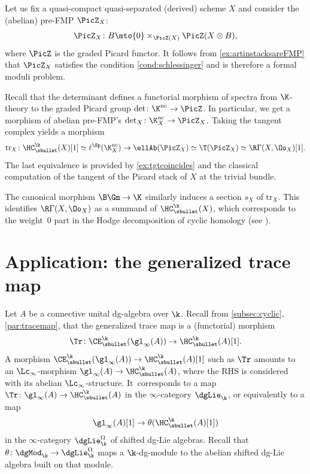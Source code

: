 \begin{ex}

Let us fix a quasi-compact quasi-separated (derived) scheme $X$ and consider the (abelian) pre-FMP $\PicZ_X$:
\[
\PicZ_X \colon B \mto \{0\} \times_{\PicZ(X)} \PicZ(X \otimes B),
\]
where $\PicZ$ is the graded Picard functor.
It follows from \autoref{ex:artinstacksareFMP} that $\PicZ_X$ satisfies the condition \eqref{cond:schlessinger} and is therefore a formal moduli problem.

Recall that the determinant defines a functorial morphism of spectra from $\K$-theory to the graded Picard group $\det \colon \K^\mathrm{nc} \to \PicZ$.
In particular, we get a morphism of abelian pre-FMP's $\det_X \colon \K^\mathrm{nc}_X \to \PicZ_X$.
Taking the tangent complex yields a morphism
\[
\mathrm{tr}_X \colon \HC_\sbullet^\k(X)[1] \simeq \ell^\Sp(\K^\mathrm{nc}_X) \to \ellAb(\PicZ_X) \simeq \T(\PicZ_X) \simeq \R\Gamma(X, \Oo_X)[1].
\]
The last equivalence is provided by \autoref{ex:tgtcoincides} and the classical computation of the tangent of the Picard stack of $X$ at the trivial bundle.

The canonical morphism $\B\Gm \to \K$ similarly induces a section $s_X$ of $\mathrm{tr}_X$. This identifies $\R\Gamma(X, \Oo_X)$ as a summand of $\HC_\sbullet^\k(X)$, which corresponds to the weight~$0$ part in the Hodge decomposition of cyclic homology (see \cite{weibel:cyclichodge}).
\end{ex}

\section{Application: the generalized trace map}
\label{sec:tracemap}

Let $A$ be a connective unital dg-algebra over $\k$. Recall from \autoref{subsec:cyclic}, \autoref{par:tracemap}, that the generalized trace map is a (functorial) morphism
\[
\Tr \colon \CE^\k_\sbullet(\gl_\infty(A)) \to \HC_\sbullet^\k(A) [1].
\]
A morphism $\CE^\k_\sbullet(\gl_\infty(A)) \to \HC_\sbullet^\k(A)[1]$ such as $\Tr$ amounts to an $\Lc_\infty$-morphism $\gl_\infty(A) \to \HC_\sbullet^\k(A)$, where the RHS is considered with its abelian $\Lc_\infty$-structure. It~corresponds to a map $\Tr \colon \gl_\infty(A) \to \HC_\sbullet^\k(A)$ in the $\infty$-category $\dgLie_\k$, or equivalently to a map
\[
\gl_\infty(A)[1] \to \theta (\HC_\sbullet^\k(A)[1])
\]
in the $\infty$-category $\dgLie_\k^\Omega$ of shifted dg-Lie algebras. Recall that $\theta \colon \dgMod_\k \to \dgLie_\k^\Omega$ maps a $\k$-dg-module to the abelian shifted dg-Lie algebra built on that module.

